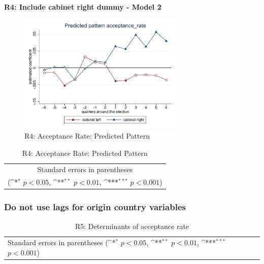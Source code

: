 \documentclass[10pt,a4paper]{scrartcl}
\begin{document}
\clearpage
\textbf{R4: Include cabinet right dummy - Model 2}
\begin{figure}[!ht]
	\centering
	\includegraphics[width=0.7\textwidth]{figures_edited/acceptance_rate_graph2_R4.pdf}
	\caption{R4: Acceptance Rate: Predicted Pattern}
\end{figure}

\begin{table}[!ht]\centering
	\footnotesize
	\renewcommand{\arraystretch}{1.2}
	\def\sym#1{\ifmmode^{#1}\else\(^{#1}\)\fi}
	\caption{R4: Acceptance Rate: Predicted Pattern}
	\begin{tabular}{l*{2}{c}}
		\hline\hline
		
		\hline\hline
		\multicolumn{3}{c}{\footnotesize Standard errors in parentheses} \\
		\multicolumn{3}{c}{\footnotesize (\sym{*} \(p<0.05\), \sym{**} \(p<0.01\), \sym{***} \(p<0.001\))} \\
	\end{tabular}
\end{table}





\clearpage
\FloatBarrier
\subsubsection{Do not use lags for origin country variables}
\begin{table}[!ht]\centering
	\renewcommand{\arraystretch}{1.25}
	\small
	\def\sym#1{\ifmmode^{#1}\else\(^{#1}\)\fi}
	\caption{R5: Determinants of acceptance rate}
	\begin{tabular}{l*{3}{c}}
		\hline\hline
		
		\hline\hline
		\multicolumn{4}{l}{\footnotesize Standard errors in parentheses (\sym{*} \(p<0.05\), \sym{**} \(p<0.01\), \sym{***} \(p<0.001\))}\\
	\end{tabular}
\end{table}
\end{document}
